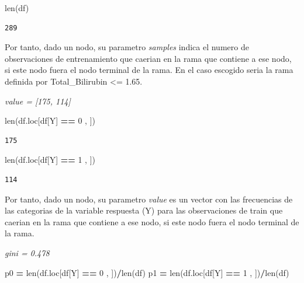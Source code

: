\documentclass[
  11pt,
  a4paper,
]{article}
\newenvironment{Shaded}{\begin{snugshade}}{\end{snugshade}}
\newcommand{\BuiltInTok}[1]{#1}
\newcommand{\DecValTok}[1]{\textcolor[rgb]{0.00,0.00,0.81}{#1}}
\newcommand{\NormalTok}[1]{#1}
\newcommand{\OperatorTok}[1]{\textcolor[rgb]{0.81,0.36,0.00}{\textbf{#1}}}
\newcommand{\StringTok}[1]{\textcolor[rgb]{0.31,0.60,0.02}{#1}}
\begin{document}
\begin{Shaded}
\begin{Highlighting}[]
\BuiltInTok{len}\NormalTok{(df)}
\end{Highlighting}
\end{Shaded}

\begin{verbatim}
289
\end{verbatim}

Por tanto, dado un nodo, su parametro \emph{samples} indica el numero de
observaciones de entrenamiento que caerian en la rama que contiene a ese
nodo, si este nodo fuera el nodo terminal de la rama. En el caso
escogido seria la rama definida por Total\_Bilirubin \textless= 1.65.

\vspace{0.2cm}

\emph{value = {[}175, 114{]}}

\begin{Shaded}
\begin{Highlighting}[]
\BuiltInTok{len}\NormalTok{(df.loc[df[}\StringTok{\textquotesingle{}Y\textquotesingle{}}\NormalTok{] }\OperatorTok{==} \DecValTok{0}\NormalTok{ , ])}
\end{Highlighting}
\end{Shaded}

\begin{verbatim}
175
\end{verbatim}

\begin{Shaded}
\begin{Highlighting}[]
\BuiltInTok{len}\NormalTok{(df.loc[df[}\StringTok{\textquotesingle{}Y\textquotesingle{}}\NormalTok{] }\OperatorTok{==} \DecValTok{1}\NormalTok{ , ])}
\end{Highlighting}
\end{Shaded}

\begin{verbatim}
114
\end{verbatim}

Por tanto, dado un nodo, su parametro \emph{value} es un vector con las
frecuencias de las categorias de la variable respuesta (Y) para las
observaciones de train que caerian en la rama que contiene a ese nodo,
si este nodo fuera el nodo terminal de la rama.

\vspace{0.2cm}

\emph{gini = 0.478}

\begin{Shaded}
\begin{Highlighting}[]
\NormalTok{p0 }\OperatorTok{=} \BuiltInTok{len}\NormalTok{(df.loc[df[}\StringTok{\textquotesingle{}Y\textquotesingle{}}\NormalTok{] }\OperatorTok{==} \DecValTok{0}\NormalTok{ , ])}\OperatorTok{/}\BuiltInTok{len}\NormalTok{(df)}
\NormalTok{p1 }\OperatorTok{=} \BuiltInTok{len}\NormalTok{(df.loc[df[}\StringTok{\textquotesingle{}Y\textquotesingle{}}\NormalTok{] }\OperatorTok{==} \DecValTok{1}\NormalTok{ , ])}\OperatorTok{/}\BuiltInTok{len}\NormalTok{(df)}
\end{Highlighting}
\end{Shaded}
\end{document}
